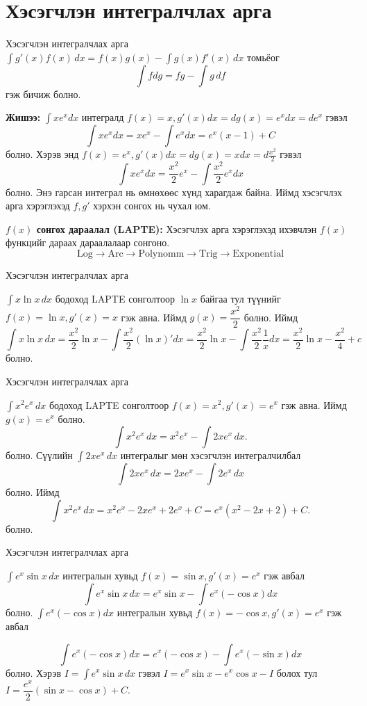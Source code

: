 \section{Хэсэгчлэн интегралчлах арга}
\begin{frame}[allowframebreaks]{Хэсэгчлэн интегралчлах арга}
$\displaystyle \int g'(x)f(x)\,dx = f(x)g(x) - \int g(x)f'(x)\,dx$ томьёог
\[
\int fdg = fg - \int g\,df
\] гэж бичиж болно. 

\textbf{Жишээ:}
$\int x e^x dx $ интегралд $f(x)=x, g'(x)dx=dg(x)=e^xdx=de^x$ гэвэл
\[
\int x e^x dx = xe^x - \int e^x dx = e^x(x -1)+C
\] болно. Хэрэв энд $f(x)=e^x, g'(x)dx=dg(x)=xdx=d\frac{x^2}{2}$ гэвэл
\[
\int x e^x dx = \frac{x^2}{2}e^x - \int \frac{x^2}{2}e^x dx
\] болно. Энэ гарсан интеграл нь өмнөхөөс хүнд харагдаж байна. Иймд хэсэгчлэх арга хэрэглэхэд $f, g'$ хэрхэн сонгох нь чухал юм.

\textbf{$f(x)$ сонгох дараалал (LAPTE):} Хэсэгчлэх арга хэрэглэхэд ихэвчлэн $f(x)$ функцийг дараах дараалалаар сонгоно.
\[
\text{Log} \rightarrow \text{Arc} \rightarrow \text{Polynomm} \rightarrow \text{Trig} \rightarrow \text{Exponential}
\]
\end{frame}

\begin{frame}[allowframebreaks]{Хэсэгчлэн интегралчлах арга}
\begin{example}
    $\displaystyle\int x\ln x \,dx$ бодоход LAPTE сонголтоор $\ln x$ байгаа тул түүнийг $f(x)=\ln x, g'(x)=x$ гэж авна. Иймд $g(x)=\dfrac{x^2}{2}$ болно. Иймд 
    $$\int x\ln x \,dx=\dfrac{x^2}{2}\ln x-\int \dfrac{x^2}{2}(\ln x)'dx=\dfrac{x^2}{2}\ln x-\int \dfrac{x^2}{2}\dfrac{1}{x}dx=\dfrac{x^2}{2}\ln x-\dfrac{x^2}{4}+c$$ болно.
\end{example}
\end{frame}

\begin{frame}[allowframebreaks]{Хэсэгчлэн интегралчлах арга}
\begin{example} $\int x^{2}e^{x}\,dx$ бодоход LAPTE сонголтоор $f(x)=x^2, g'(x)=e^x$ гэж авна. Иймд $g(x)=e^x$ болно.
 \[
\int x^{2}e^{x}\,dx
= x^{2}e^{x}-\int 2xe^{x}\,dx.
\] болно.
Сүүлийн $\displaystyle\int 2xe^{x}\,dx$ интегралыг мөн хэсэгчлэн интегралчилбал 
$$\int 2xe^{x}\,dx= 2xe^{x}-\int 2e^{x}\,dx$$ болно. Иймд 
\[
\int x^{2}e^{x}\,dx= x^{2}e^{x}-2xe^{x}+2e^{x}+C
= e^{x}(x^{2}-2x+2)+C.
\]
болно.
\end{example} 
\end{frame}

\begin{frame}[allowframebreaks]{Хэсэгчлэн интегралчлах арга}
\begin{example} $\displaystyle\int e^{x}\sin x\,dx $ интегралын хувьд  $f(x)=\sin x, g'(x)=e^x$ гэж авбал
    \[
\int e^{x}\sin x\,dx =e^x\sin x-\int e^x (-\cos x) dx
\]
болно. $\int e^x (-\cos x) dx$ интегралын хувьд  $f(x)=-\cos x, g'(x)=e^x$ гэж авбал

$$\int e^x (-\cos x) dx=e^x (-\cos x)-\int e^x(-\sin x) dx$$ болно. Хэрэв $I=\displaystyle\int e^{x}\sin x\,dx$ гэвэл 
$I=e^x\sin x-e^x\cos x-I$ болох тул $I=\dfrac{e^{x}}{2}(\sin x - \cos x) + C.$
\end{example}
\end{frame}


